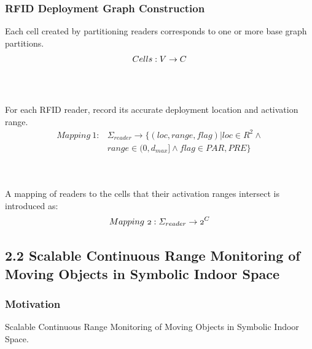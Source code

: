 \documentclass{beamer}
\begin{document}
\begin{frame}
\frametitle{RFID Deployment Graph Construction}

\small{Each cell created by partitioning readers corresponds to one or more base graph partitions.}
\pause
\begin{equation}
\mathnormal{Cells: V \rightarrow C}
\end{equation}
\\~\\
\pause

\small{For each RFID reader, record its accurate deployment location and activation range.}
\pause
\begin{equation}
\begin{aligned}
Mapping~1: &\Sigma_{reader} \rightarrow \{ (loc, range, flag) | loc \in R^2 \wedge \\
  &range \in (0,d_{max}] \wedge flag \in {PAR, PRE} \}
\end{aligned}
\end{equation}
\\~\\
\pause

\small{A mapping of readers to the cells that their activation ranges intersect is introduced as:}
\pause
\begin{equation}
\mathnormal{
Mapping~2: \Sigma_{reader} \rightarrow 2^C
}
\end{equation}

\end{frame}



\subsection{2.2 Scalable Continuous Range Monitoring of Moving Objects in Symbolic Indoor Space} %

\begin{frame}
\frametitle{Motivation}
Scalable Continuous Range Monitoring of Moving Objects in Symbolic Indoor Space.~\cite{DBLP:conf/cikm/YangLJ09}\\~\\


\end{frame}
\end{document}
